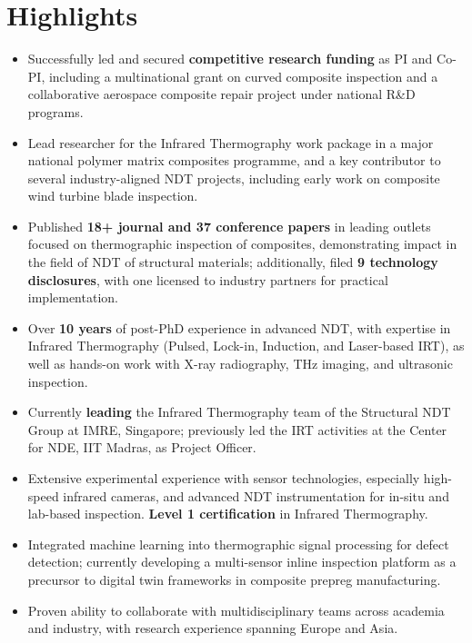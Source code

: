 \documentclass{my_cv}%
\begin{document}
\section{Highlights}
\vspace{1.0em}
\begin{itemize}[leftmargin=0.15in]
\setlength\itemsep{-0.1em}
\item Successfully led and secured \textbf{competitive research funding} as PI and Co-PI, including a multinational grant on curved composite inspection and a collaborative aerospace composite repair project under national R\&D programs.
\item Lead researcher for the Infrared Thermography work package in a major national polymer matrix composites programme, and a key contributor to several industry-aligned NDT projects, including early work on composite wind turbine blade inspection.
\item Published \textbf{18+ journal and 37 conference papers} in leading outlets focused on thermographic inspection of composites, demonstrating impact in the field of NDT of structural materials; additionally, filed \textbf{9 technology disclosures}, with one licensed to industry partners for practical implementation.
\item Over \textbf{10 years} of post-PhD experience in advanced NDT, with expertise in Infrared Thermography (Pulsed, Lock-in, Induction, and Laser-based IRT), as well as hands-on work with X-ray radiography, THz imaging, and ultrasonic inspection.
\item Currently \textbf{leading} the Infrared Thermography team of the Structural NDT Group at IMRE, Singapore; previously led the IRT activities at the Center for NDE, IIT Madras, as Project Officer.
\item Extensive experimental experience with sensor technologies, especially high-speed infrared cameras, and advanced NDT instrumentation for in-situ and lab-based inspection. \textbf{Level 1 certification} in Infrared Thermography.
\item Integrated machine learning into thermographic signal processing for defect detection; currently developing a multi-sensor inline inspection platform as a precursor to digital twin frameworks in composite prepreg manufacturing.
\item Proven ability to collaborate with multidisciplinary teams across academia and industry, with research experience spanning Europe and Asia.
\end{itemize}
\end{document}
